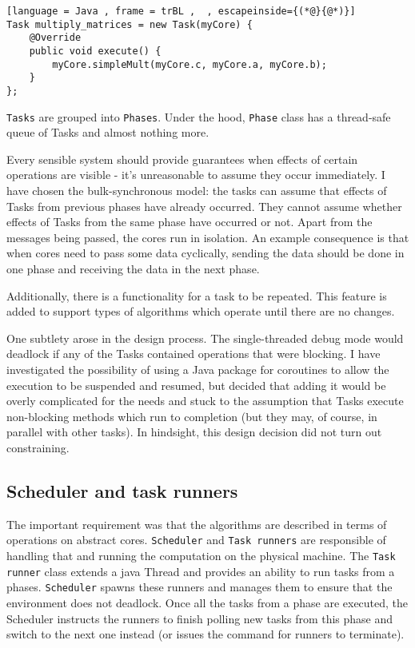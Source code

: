 \documentclass[12pt,a4paper,twoside,openright]{report}
\begin{document}
\begin{lstlisting}[language = Java , frame = trBL ,  , escapeinside={(*@}{@*)}]
Task multiply_matrices = new Task(myCore) {
    @Override
    public void execute() {
        myCore.simpleMult(myCore.c, myCore.a, myCore.b);
    }
};
\end{lstlisting}


\texttt{Tasks} are grouped into \texttt{Phases}. Under the hood, \texttt{Phase} class has a thread-safe queue of Tasks and almost nothing more.

Every sensible system should provide guarantees when effects of certain operations are visible - it's unreasonable to assume they occur immediately. I have chosen the bulk-synchronous model: the tasks can assume that effects of Tasks from previous phases have already occurred. They cannot assume whether effects of Tasks from the same phase have occurred or not. Apart from the messages being passed, the cores run in isolation. An example consequence is that when cores need to pass some data cyclically, sending the data should be done in one phase and receiving the data in the next phase.

Additionally, there is a functionality for a task to be repeated. This feature is added to support types of algorithms which operate until there are no changes.

One subtlety arose in the design process. The single-threaded debug mode would deadlock if any of the Tasks contained operations that were blocking. I have investigated the possibility of using a Java package for coroutines to allow the execution to be suspended and resumed, but decided that adding it would be overly complicated for the needs and stuck to the assumption that Tasks execute non-blocking methods which run to completion (but they may, of course, in parallel with other tasks). In hindsight, this design decision did not turn out constraining.

\subsection{Scheduler and task runners}
The important requirement was that the algorithms are described in terms of operations on abstract cores. \texttt{Scheduler} and \texttt{Task runners} are responsible of handling that and running the computation on the physical machine. The \texttt{Task runner} class extends a java Thread and provides an ability to run tasks from a phases. \texttt{Scheduler} spawns these runners and manages them to ensure that the environment does not deadlock. Once all the tasks from a phase are executed, the Scheduler instructs the runners to finish polling new tasks from this phase and switch to the next one instead (or issues the command for runners to terminate).
\end{document}
